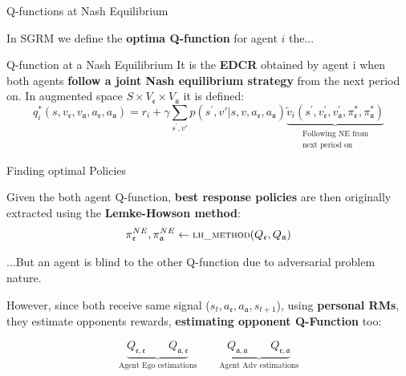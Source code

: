 \documentclass[10pt, aspectratio=169]{beamer}
\newcommand{\evidenzia}[1]{\textcolor{verdeSalvia}{\textbf{#1}}}
\begin{document}
\begin{frame}{Q-functions at Nash Equilibrium}

    In SGRM we define the \evidenzia{optima Q-function} for agent $i$ the...
    \vspace{0.3cm}
    \begin{block}{Q-function at a Nash Equilibrium}
    It is the \evidenzia{EDCR} obtained by agent i when both agents \evidenzia{follow a joint Nash equilibrium strategy} from the next period on. In augmented space $S \times V_{\mathfrak{e}} \times V_{\mathfrak{a}}$ it is defined:
    \[ q_{i}^{*}(s,v_{\mathfrak{e}},v_{\mathfrak{a}},a_{\mathfrak{e}},a_{\mathfrak{a}})=r_{i} + \gamma\sum_{s^{\prime}, v'}p(s^{\prime},v'|s,v,a_{\mathfrak{e}},a_{\mathfrak{a}})\underbrace{\tilde{v}_{i}(s^{\prime},v_{\mathfrak{e}}^{\prime},v_{\mathfrak{a}}^{\prime},\pi_{\mathfrak{e}}^{*},\pi_{\mathfrak{a}}^{*})}_{\substack{\text{Following NE from}\\\text{next period on}}} \]
    
\end{block}
\end{frame}




\begin{frame}{Finding optimal Policies}

    Given the both agent Q-function, \evidenzia{best response policies} are then originally extracted using the \evidenzia{Lemke-Howson method}:
    $$\pi^{NE}_\mathfrak{e}, \pi^{NE}_\mathfrak{a} \leftarrow \textsc{\text{\small lh\_method}}(Q_\mathfrak{e},Q_\mathfrak{a})$$

    ...But an agent is blind to the other Q-function due to adversarial problem nature. 
    
    However, since both receive same signal ($s_t, a_\mathfrak{e},a_\mathfrak{a},s_{t+1}$), using \evidenzia{personal RMs}, they estimate opponents rewards, \evidenzia{estimating opponent Q-Function} too:

    $$\underbrace{Q_{\mathfrak{e},\mathfrak{e}} \quad\quad Q_{\mathfrak{a},\mathfrak{e}}}_{\text{Agent Ego estimations}} \quad\quad \underbrace{Q_{\mathfrak{a},\mathfrak{a}} \quad\quad Q_{\mathfrak{e},\mathfrak{a}}}_{\text{Agent Adv estimations}}$$
\end{frame}
\end{document}
